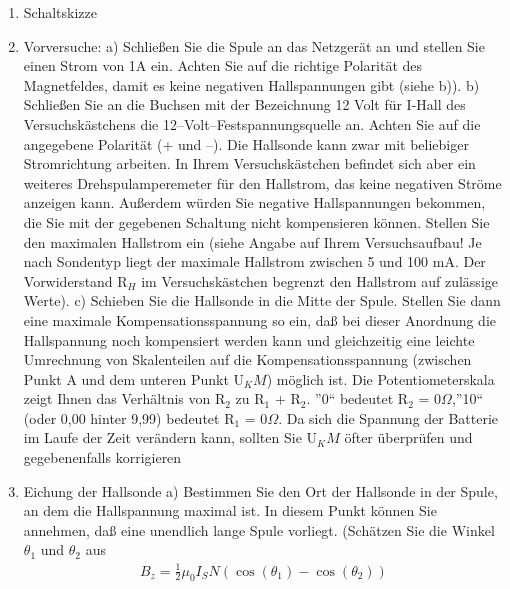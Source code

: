 \documentclass[12pt]{scrartcl}
\begin{document}
\begin{enumerate}
\item Schaltskizze \newline
\item Vorversuche: \newline
a) Schließen Sie die Spule an das Netzgerät an und stellen Sie einen Strom von 1A ein. Achten Sie auf die richtige Polarität des Magnetfeldes, damit es keine negativen Hallspannungen gibt (siehe b)).
\newline
b) Schließen Sie an die Buchsen mit der Bezeichnung 12 Volt für I-Hall des Versuchskästchens die 12–Volt–Festspannungsquelle an. Achten Sie auf die angegebene Polarität (+ und –). Die Hallsonde kann zwar mit beliebiger Stromrichtung arbeiten. In Ihrem Versuchskästchen befindet sich aber ein weiteres Drehspulamperemeter für den Hallstrom, das keine negativen Ströme anzeigen kann. Außerdem würden Sie negative Hallspannungen bekommen, die
Sie mit der gegebenen Schaltung nicht kompensieren können. Stellen Sie den
maximalen Hallstrom ein (siehe Angabe auf Ihrem Versuchsaufbau! Je nach
Sondentyp liegt der maximale Hallstrom zwischen 5 und 100 mA. Der Vorwiderstand
R$_H$ im Versuchskästchen begrenzt den Hallstrom auf zulässige Werte).
\newline
c) Schieben Sie die Hallsonde in die Mitte der Spule. Stellen Sie dann eine maximale Kompensationsspannung so ein, daß bei dieser Anordnung die Hallspannung noch kompensiert werden kann und gleichzeitig eine leichte Umrechnung von Skalenteilen auf die Kompensationsspannung (zwischen Punkt A und dem unteren Punkt U$_KM$) möglich ist. Die Potentiometerskala zeigt Ihnen das Verhältnis von R$_2$ zu R$_1$ + R$_2$.
”0“ bedeutet R$_2$ = 0$\Omega$,”10“ (oder
0,00 hinter 9,99) bedeutet R$_1$ = 0$\Omega$. Da sich die Spannung der Batterie im Laufe der Zeit verändern kann, sollten Sie U$_KM$ öfter überprüfen und gegebenenfalls korrigieren
\item Eichung der Hallsonde 
\newline
a) Bestimmen Sie den Ort der Hallsonde in der Spule, an dem die Hallspannung maximal ist. In diesem Punkt können Sie annehmen, daß eine unendlich lange
Spule vorliegt. (Schätzen Sie die Winkel
$\theta_1$ und $\theta_2$ aus 
\begin{align*}
B_z = \frac{1}{2} \mu_0 I_S N (\cos(\theta_1) - \cos(\theta_2)) 
\end{align*}


\end{enumerate}
\end{document}
